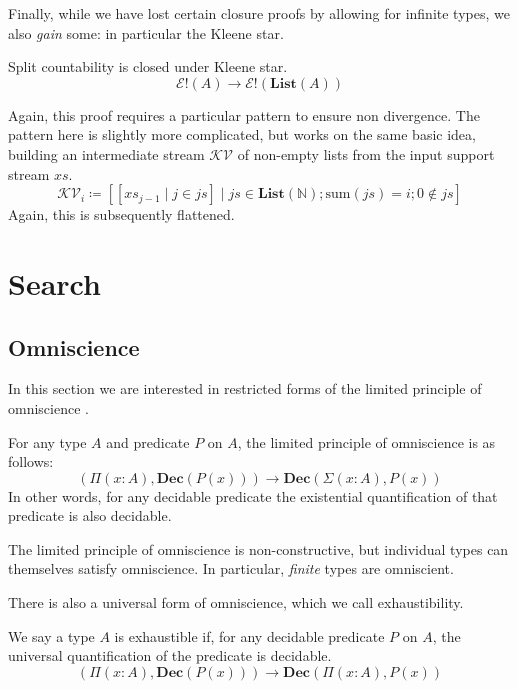 Finally, while we have lost certain closure proofs by allowing for infinite
types, we also \emph{gain} some: in particular the Kleene star.
\begin{romtheorem}
  Split countability is closed under Kleene star.
  \begin{equation}
    \mathcal{E}!(A) \rightarrow \mathcal{E}!(\mathbf{List}(A))
  \end{equation}
\end{romtheorem}
Again, this proof requires a particular pattern to ensure non divergence.
The pattern here is slightly more complicated, but works on the same basic idea,
building an intermediate stream \(\mathcal{KV}\) of non-empty lists from the
input support stream \(\mathit{xs}\).
\begin{equation}
  \mathcal{KV}_i \coloneqq \left[ \left[ \mathit{xs}_{j - 1} \mid j \in \mathit{js} \right] \mid \mathit{js} \in \mathbf{List}(\mathbb{N}) ; \text{sum}(\mathit{js}) = i ; 0 \notin \mathit{js}  \right]
\end{equation}
Again, this is subsequently flattened.
\section{Search} \label{search}
\subsection{Omniscience}
In this section we are interested in restricted forms of the limited principle
of omniscience \cite{myhillErrettBishopFoundations1972}.
\begin{romdefinition}
  For any type \(A\) and predicate \(P\) on \(A\), the limited principle of
  omniscience is as follows:
  \begin{equation}
    \left( \Pi {(x : A)} , \mathbf{Dec}(P(x)) \right) \rightarrow \mathbf{Dec} \left( \Sigma {(x : A)} , P(x) \right)
  \end{equation}
  In other words, for any decidable predicate the existential quantification of
  that predicate is also decidable.
\end{romdefinition}
The limited principle of omniscience is non-constructive, but individual types
can themselves satisfy omniscience.
In particular, \emph{finite} types are omniscient.

There is also a universal form of omniscience, which we call exhaustibility.
\begin{romdefinition}[Exhaustibility]
  We say a type \(A\) is exhaustible if, for any decidable predicate \(P\) on
  \(A\), the universal quantification of the predicate is decidable.
  \begin{equation}
    \left( \Pi {(x : A)} , \mathbf{Dec}(P(x)) \right) \rightarrow \mathbf{Dec} \left( \Pi {(x : A)} , P(x) \right)
  \end{equation}
\end{romdefinition}


